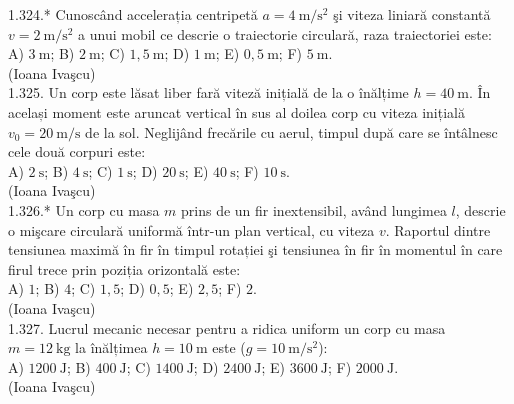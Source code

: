 1.324.* Cunoscând accelerația centripetă $a=4 \mathrm{~m} / \mathrm{s}^{2}$ şi viteza liniară constantă $v=2 \mathrm{~m} / \mathrm{s}^{2}$ a unui mobil ce descrie o traiectorie circulară, raza traiectoriei este:\\ A) $3 \mathrm{~m}$; B) $2 \mathrm{~m}$; C) $1,5 \mathrm{~m}$; D) $1 \mathrm{~m}$; E) $0,5 \mathrm{~m}$; F) $5 \mathrm{~m}$.\\ (Ioana Ivaşcu)\\

1.325. Un corp este lăsat liber fară viteză inițială de la o înălțime $h=40 \mathrm{~m}$. În același moment este aruncat vertical în sus al doilea corp cu viteza inițială $v_{0}=20 \mathrm{~m} / \mathrm{s}$ de la sol. Neglijând frecările cu aerul, timpul după care se întâlnesc cele două corpuri este:\\ A) $2 \mathrm{~s}$; B) $4 \mathrm{~s}$; C) $1 \mathrm{~s}$; D) $20 \mathrm{~s}$; E) $40 \mathrm{~s}$; F) $10 \mathrm{~s}$.\\ (Ioana Ivaşcu)\\

1.326.* Un corp cu masa $m$ prins de un fir inextensibil, având lungimea $l$, descrie o mişcare circulară uniformă într-un plan vertical, cu viteza $v$. Raportul dintre tensiunea maximă în fir în timpul rotației şi tensiunea în fir în momentul în care firul trece prin poziția orizontală este:\\ A) $1$; B) $4$; C) $1,5$; D) $0,5$; E) $2,5$; F) $2$.\\ (Ioana Ivaşcu)\\

1.327. Lucrul mecanic necesar pentru a ridica uniform un corp cu masa $m=12 \mathrm{~kg}$ la înălțimea $h=10 \mathrm{~m}$ este ($g=10 \mathrm{~m} / \mathrm{s}^{2}$):\\ A) $1200 \mathrm{~J}$; B) $400 \mathrm{~J}$; C) $1400 \mathrm{~J}$; D) $2400 \mathrm{~J}$; E) $3600 \mathrm{~J}$; F) $2000 \mathrm{~J}$.\\ (Ioana Ivaşcu)\\

